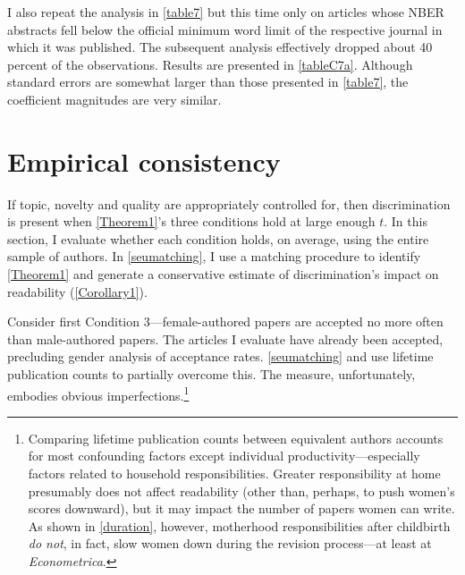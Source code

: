 \begin{appendices}


I also repeat the analysis in \autoref{table7} but this time only on articles whose NBER abstracts fell below the official minimum word limit of the respective journal in which it was published. The subsequent analysis effectively dropped about 40 percent of the observations. Results are presented in \autoref{tableC7a}. Although standard errors are somewhat larger than those presented in \autoref{table7}, the coefficient magnitudes are very similar.



\clearpage

\section{Empirical consistency}
\label{seuempirical}

If topic, novelty and quality are appropriately controlled for, then discrimination is present when \autoref{Theorem1}'s three conditions hold at large enough $t$. In this section, I evaluate whether each condition holds, on average, using the entire sample of authors. In \autoref{seumatching}, I use a matching procedure to identify \autoref{Theorem1} and generate a conservative estimate of discrimination's impact on readability (\autoref{Corollary1}).

Consider first Condition 3---female-authored papers are accepted no more often than male-authored papers. The articles I evaluate have already been accepted, precluding gender analysis of acceptance rates. \autoref{seumatching} and  use lifetime publication counts to partially overcome this. The measure, unfortunately, embodies obvious imperfections.\footnote{\label{Footnote67}Comparing lifetime publication counts between equivalent authors accounts for most confounding factors except individual productivity---especially factors related to household responsibilities. Greater responsibility at home presumably does not affect readability (other than, perhaps, to push women's scores downward), but it may impact the number of papers women can write. As shown in \autoref{duration}, however, motherhood responsibilities after childbirth \emph{do not}, in fact, slow women down during the revision process---at least at \emph{Econometrica}.}


\end{appendices}
